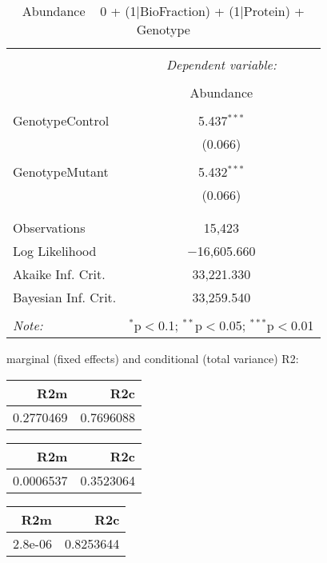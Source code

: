 \documentclass[11pt]{report}
\begin{document}
\begin{table}[!htbp] \centering 
  \caption{Abundance ~ 0 + (1|BioFraction) + (1|Protein) + Genotype} 
  \label{} 
\begin{tabular}{@{\extracolsep{5pt}}lc} 
\\[-1.8ex]\hline 
\hline \\[-1.8ex] 
 & \multicolumn{1}{c}{\textit{Dependent variable:}} \\ 
\cline{2-2} 
\\[-1.8ex] & Abundance \\ 
\hline \\[-1.8ex] 
 GenotypeControl & 5.437$^{***}$ \\ 
  & (0.066) \\ 
  & \\ 
 GenotypeMutant & 5.432$^{***}$ \\ 
  & (0.066) \\ 
  & \\ 
\hline \\[-1.8ex] 
Observations & 15,423 \\ 
Log Likelihood & $-$16,605.660 \\ 
Akaike Inf. Crit. & 33,221.330 \\ 
Bayesian Inf. Crit. & 33,259.540 \\ 
\hline 
\hline \\[-1.8ex] 
\textit{Note:}  & \multicolumn{1}{r}{$^{*}$p$<$0.1; $^{**}$p$<$0.05; $^{***}$p$<$0.01} \\ 
\end{tabular} 
\end{table} 
marginal (fixed effects) and conditional (total variance) R2:

\begin{tabular}{r|r}
\hline
R2m & R2c\\
\hline
0.2770469 & 0.7696088\\
\hline
\end{tabular}

\begin{tabular}{r|r}
\hline
R2m & R2c\\
\hline
0.0006537 & 0.3523064\\
\hline
\end{tabular}

\begin{tabular}{r|r}
\hline
R2m & R2c\\
\hline
2.8e-06 & 0.8253644\\
\hline
\end{tabular}
\end{document}
